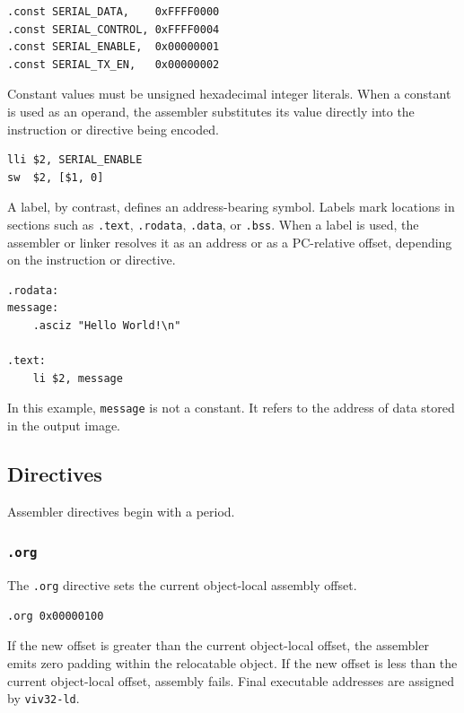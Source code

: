\begin{verbatim}
.const SERIAL_DATA,    0xFFFF0000
.const SERIAL_CONTROL, 0xFFFF0004
.const SERIAL_ENABLE,  0x00000001
.const SERIAL_TX_EN,   0x00000002
\end{verbatim}

Constant values must be unsigned hexadecimal integer literals. When a constant is used
as an operand, the assembler substitutes its value directly into the instruction or
directive being encoded.

\begin{verbatim}
lli $2, SERIAL_ENABLE
sw  $2, [$1, 0]
\end{verbatim}

A label, by contrast, defines an address-bearing symbol. Labels mark locations in
sections such as \texttt{.text}, \texttt{.rodata}, \texttt{.data}, or \texttt{.bss}.
When a label is used, the assembler or linker resolves it as an address or as a
PC-relative offset, depending on the instruction or directive.

\begin{verbatim}
.rodata:
message:
    .asciz "Hello World!\n"

.text:
    li $2, message
\end{verbatim}

In this example, \texttt{message} is not a constant. It refers to the address of data
stored in the output image.

\subsection{Directives}

Assembler directives begin with a period.

\subsubsection{\texttt{.org}}

The \texttt{.org} directive sets the current object-local assembly offset.

\begin{verbatim}
.org 0x00000100
\end{verbatim}

If the new offset is greater than the current object-local offset, the assembler emits
zero padding within the relocatable object. If the new offset is less than the current
object-local offset, assembly fails. Final executable addresses are assigned by
\texttt{viv32-ld}.

